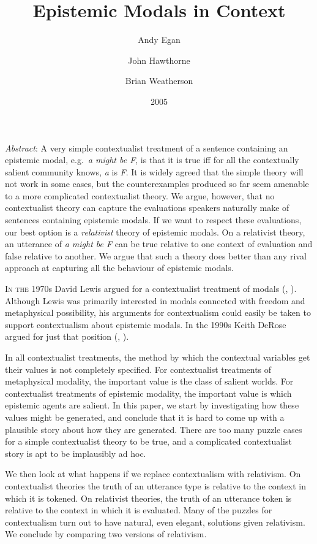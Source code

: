 \documentclass[
  11pt,
  letterpaper,
  DIV=11,
  numbers=noendperiod,
  twoside]{scrartcl}
\title{Epistemic Modals in Context}
\author{Andy Egan \and John Hawthorne \and Brian Weatherson}
\date{2005}
\renewenvironment{abstract}
 {\vspace{-1.25cm}
 \quotation\small\noindent\emph{Abstract}:}
 {\endquotation}
\renewenvironment{abstract}
 {\quotation\small\noindent\emph{Abstract}:}
 {\endquotation\vspace{-0.02cm}}
\begin{document}
\maketitle
\begin{abstract}
A very simple contextualist treatment of a sentence containing an
epistemic modal, e.g.~\emph{a might be F}, is that it is true iff for
all the contextually salient community knows, \emph{a} is \emph{F}. It
is widely agreed that the simple theory will not work in some cases, but
the counterexamples produced so far seem amenable to a more complicated
contextualist theory. We argue, however, that no contextualist theory
can capture the evaluations speakers naturally make of sentences
containing epistemic modals. If we want to respect these evaluations,
our best option is a \emph{relativist} theory of epistemic modals. On a
relativist theory, an utterance of \emph{a might be F} can be true
relative to one context of evaluation and false relative to another. We
argue that such a theory does better than any rival approach at
capturing all the behaviour of epistemic modals.
\end{abstract}


\lettrine{I}{n the} 1970s David Lewis argued for a contextualist
treatment of modals (,
). Although Lewis was primarily
interested in modals connected with freedom and metaphysical
possibility, his arguments for contextualism could easily be taken to
support contextualism about epistemic modals. In the 1990s Keith DeRose
argued for just that position (,
).

In all contextualist treatments, the method by which the contextual
variables get their values is not completely specified. For
contextualist treatments of metaphysical modality, the important value
is the class of salient worlds. For contextualist treatments of
epistemic modality, the important value is which epistemic agents are
salient. In this paper, we start by investigating how these values might
be generated, and conclude that it is hard to come up with a plausible
story about how they are generated. There are too many puzzle cases for
a simple contextualist theory to be true, and a complicated
contextualist story is apt to be implausibly ad hoc.

We then look at what happens if we replace contextualism with
relativism. On contextualist theories the truth of an utterance type is
relative to the context in which it is tokened. On relativist theories,
the truth of an utterance token is relative to the context in which it
is evaluated. Many of the puzzles for contextualism turn out to have
natural, even elegant, solutions given relativism. We conclude by
comparing two versions of relativism.
\end{document}
